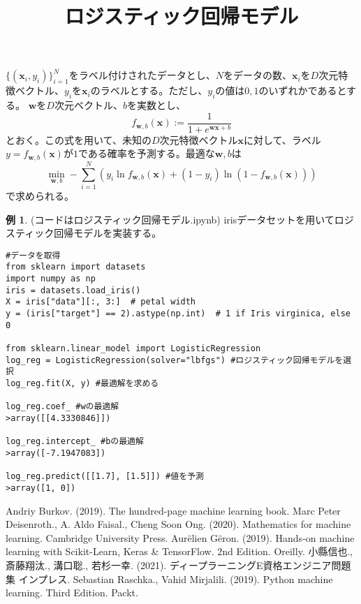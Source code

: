 \documentclass{jsarticle}
\theoremstyle{definition}
\newtheorem{ex}{例}[section]
\begin{document}
\title{ロジスティック回帰モデル}
\date{}
\maketitle
$\{(\mathbf{x}_{i},y_{i})\}_{i=1}^{N}$をラベル付けされたデータとし、$N$をデータの数、$\mathbf{x}_{i}$を$D$次元特徴ベクトル、$y_{i}$を$\mathbf{x}_{i}$のラベルとする。ただし、$y_{i}$の値は$0,1$のいずれかであるとする。
$\mathbf{w}$を$D$次元ベクトル、$b$を実数とし、
\begin{equation*}
f_{\mathbf{w},b}(\mathbf{x}):=\frac{1}{1+e^{\mathbf{w}\mathbf{x}+b}}
\end{equation*}
とおく。この式を用いて、未知の$D$次元特徴ベクトル$\mathbf{x}$に対して、ラベル$y=f_{\mathbf{w},b}(\mathbf{x})$が$1$である確率を予測する。最適な$\mathbf{w},b$は
\begin{equation*}
\min_{\mathbf{w},b}-\sum_{i=1}^{N}(y_{i}\ln f_{\mathbf{w},b}(\mathbf{x})+(1-y_{i})\ln (1-f_{\mathbf{w},b}(\mathbf{x})))
\end{equation*}
で求められる。
\begin{ex} (コードはロジスティック回帰モデル.ipynb) irisデータセットを用いてロジスティック回帰モデルを実装する。
\begin{verbatim}
#データを取得
from sklearn import datasets
import numpy as np
iris = datasets.load_iris()
X = iris["data"][:, 3:]  # petal width
y = (iris["target"] == 2).astype(np.int)  # 1 if Iris virginica, else 0

from sklearn.linear_model import LogisticRegression
log_reg = LogisticRegression(solver="lbfgs") #ロジスティック回帰モデルを選択
log_reg.fit(X, y) #最適解を求める

log_reg.coef_ #wの最適解
>array([[4.3330846]])

log_reg.intercept_ #bの最適解
>array([-7.1947083])

log_reg.predict([[1.7], [1.5]]) #値を予測
>array([1, 0])
\end{verbatim}
\end{ex}
\begin{thebibliography}{99}
 Andriy Burkov. (2019). The hundred-page machine learning book.
 Marc Peter Deisenroth., A. Aldo Faisal., Cheng Soon Ong. (2020). Mathematics for machine learning. Cambridge University Press.
 Aur\"{e}lien G\"{e}ron. (2019). Hands-on machine learning with Scikit-Learn, Keras \&  TensorFlow. 2nd Edition. Oreilly.
 小縣信也., 斎藤翔汰., 溝口聡., 若杉一幸. (2021). ディープラーニングE資格エンジニア問題集 インプレス.
 Sebastian Raschka., Vahid Mirjalili. (2019). Python machine learning. Third Edition. Packt.

\end{thebibliography}
\end{document}
